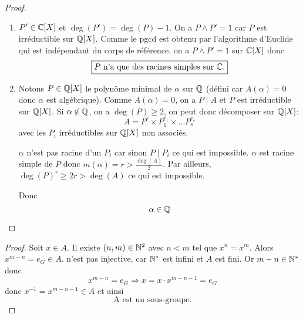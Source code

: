 \begin{proof}
	\phantom{}
	\begin{enumerate}
		\item $P'\in\mathbb{C}[X]$ et $\deg(P')=\deg(P)-1$. On a $P\wedge P'=1$ car $P$ est irréductible sur $\mathbb{Q}[X]$. Comme le pgcd est obtenu par l'algorithme d'Euclide qui est indépendant du corps de référence, on a $P\wedge P'=1$ sur $\mathbb{C}[X]$ donc 
		\begin{equation}
			\boxed{P\text{ n'a que des racines simples sur }\mathbb{C}.}
		\end{equation}
		\item Notons $P\in\mathbb{Q}[X]$ le polynôme minimal de $\alpha$ sur $\mathbb{Q}$ (défini car $A(\alpha)=0$ donc $\alpha$ est algébrique). Comme $A(\alpha)=0$, on a $P\mid A$ et $P$ est irréductible sur $\mathbb{Q}[X]$. Si $\alpha\notin\mathbb{Q}$, on a $\deg(P)\geqslant2$, on peut donc décomposer sur $\mathbb{Q}[X]$:
		\begin{equation}
			A=P^{r}\times P_{1}^{r_{1}}\times\dots P_{s}^{r_{s}}
		\end{equation}
		avec les $P_{i}$ irréductibles sur $\mathbb{Q}[X]$ non associés.

		$\alpha$ n'est pas racine d'un $P_{i}$ car sinon $P\mid P_{i}$ ce qui est impossible. $\alpha$ est racine simple de $P$ donc $m(\alpha)=r>\frac{\deg(A)}{2}$. Par ailleurs, $\deg(P)^{r}\geqslant2r>\deg(A)$ ce qui est impossible.

		Donc 
		\begin{equation}
			\alpha\in\mathbb{Q}
		\end{equation}
	\end{enumerate}
\end{proof}

\begin{proof}
	Soit $x\in A$. Il existe $(n,m)\in\mathbb{N}^{2}$ avec $n<m$ tel que $x^{n}=x^{m}$. Alors $x^{m-n}=e_{G}\in A$.
	n'est pas injective, car $\mathbb{N}^{*}$ est infini et $A$ est fini. Or $m-n\in\mathbb{N}^{*}$ donc
	\begin{equation}
		x^{m-n}=e_{G}\Rightarrow x=x\cdot x^{m-n-1}=e_{G}
	\end{equation}
	donc $x^{-1}=x^{m-n-1}\in A$ et ainsi 
	\begin{equation}
		\boxed{\text{A est un sous-groupe.}}
	\end{equation}
\end{proof}

